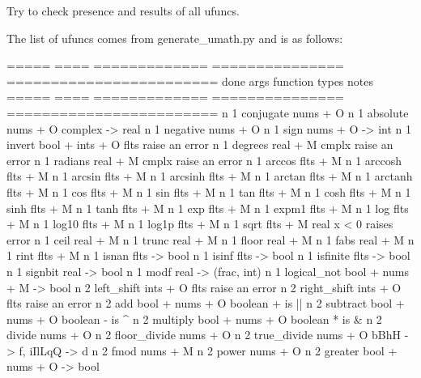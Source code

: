 \begin{DoxyVerb}Try to check presence and results of all ufuncs.

The list of ufuncs comes from generate_umath.py and is as follows:

=====  ====  =============  ===============  ========================
done   args   function        types                notes
=====  ====  =============  ===============  ========================
n      1     conjugate      nums + O
n      1     absolute       nums + O         complex -> real
n      1     negative       nums + O
n      1     sign           nums + O         -> int
n      1     invert         bool + ints + O  flts raise an error
n      1     degrees        real + M         cmplx raise an error
n      1     radians        real + M         cmplx raise an error
n      1     arccos         flts + M
n      1     arccosh        flts + M
n      1     arcsin         flts + M
n      1     arcsinh        flts + M
n      1     arctan         flts + M
n      1     arctanh        flts + M
n      1     cos            flts + M
n      1     sin            flts + M
n      1     tan            flts + M
n      1     cosh           flts + M
n      1     sinh           flts + M
n      1     tanh           flts + M
n      1     exp            flts + M
n      1     expm1          flts + M
n      1     log            flts + M
n      1     log10          flts + M
n      1     log1p          flts + M
n      1     sqrt           flts + M         real x < 0 raises error
n      1     ceil           real + M
n      1     trunc          real + M
n      1     floor          real + M
n      1     fabs           real + M
n      1     rint           flts + M
n      1     isnan          flts             -> bool
n      1     isinf          flts             -> bool
n      1     isfinite       flts             -> bool
n      1     signbit        real             -> bool
n      1     modf           real             -> (frac, int)
n      1     logical_not    bool + nums + M  -> bool
n      2     left_shift     ints + O         flts raise an error
n      2     right_shift    ints + O         flts raise an error
n      2     add            bool + nums + O  boolean + is ||
n      2     subtract       bool + nums + O  boolean - is ^
n      2     multiply       bool + nums + O  boolean * is &
n      2     divide         nums + O
n      2     floor_divide   nums + O
n      2     true_divide    nums + O         bBhH -> f, iIlLqQ -> d
n      2     fmod           nums + M
n      2     power          nums + O
n      2     greater        bool + nums + O  -> bool

\end{DoxyVerb}
